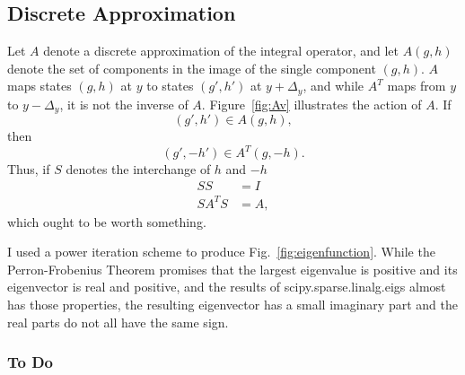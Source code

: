 \documentclass[]{article}
\begin{document}
\subsection{Discrete Approximation}
\label{sec:approximate}

Let $A$ denote a discrete approximation of the integral operator, and
let $A(g,h)$ denote the set of components in the image of the single
component $(g,h)$.  $A$ maps states $(g,h)$ at $y$ to states $(g',h')$
at $y+\Delta_y$, and while $A^T$ maps from $y$ to $y-\Delta_y$, it is
not the inverse of $A$.  Figure~\ref{fig:Av} illustrates the action of
$A$.  If
\begin{equation*}
  (g',h') \in A(g,h),
\end{equation*}
then
\begin{equation*}
  (g', -h') \in A^T(g,-h).
\end{equation*}
Thus, if $S$ denotes the interchange of $h$ and $-h$
\begin{align*}
  SS &= I \\
  SA^TS &= A,
\end{align*}
which ought to be worth something.

\begin{figure*}
  \centering
  \caption{Action of integral operator and its transpose on selected points}
  \label{fig:Av}
\end{figure*}

I used a power iteration scheme to produce
Fig.~\ref{fig:eigenfunction}.  While the Perron-Frobenius Theorem
promises that the largest eigenvalue is positive and its eigenvector
is real and positive, and the results of scipy.sparse.linalg.eigs
almost has those properties, the resulting eigenvector has a small
imaginary part and the real parts do not all have the same sign.
\begin{figure*}
  \centering
  \caption{Eigenfunction of integral operator.}
  \label{fig:eigenfunction}
\end{figure*}

\subsubsection{To Do}
\label{sec:do}
\end{document}
